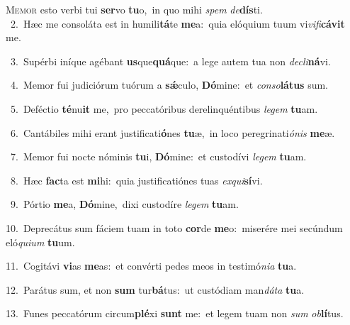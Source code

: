 \lettrine{\initial\textcolor{\initialcolor}{M}}{emor} esto verbi tui \textbf{ser}\-vo \textbf{tu}\-o,~\star in quo mihi \textit{spem} \textit{de}\-\textbf{dís}ti.\\
{\numbfont\textcolor{\numbcolor}{~2.}}~Hæc me consoláta est in humili\-\textbf{tá}\-te \textbf{me}\-a:~\star quia elóquium tuum vi\-\textit{vi}\-\textit{fi}\textbf{cá}\textbf{vit} me.\par
{\numbfont\textcolor{\numbcolor}{~3.}}~Supérbi iníque agébant \textbf{us}\-que\-\textbf{quá}\-que:~\star a lege autem tua non \textit{de}\-\textit{cli}\textbf{ná}vi.\par
{\numbfont\textcolor{\numbcolor}{~4.}}~Memor fui judiciórum tuórum a \textbf{sǽ}\-culo, \textbf{Dó}\-mine:~\star et \textit{con}\-\textit{so}\textbf{lá}\textbf{tus} sum.\par
{\numbfont\textcolor{\numbcolor}{~5.}}~Deféctio \textbf{té}\-nu\textbf{it} me,~\star pro peccatóribus derelinquéntibus \textit{le}\-\textit{gem} \textbf{tu}\-am.\par
{\numbfont\textcolor{\numbcolor}{~6.}}~Cantábiles mihi erant justificati\-\textbf{ó}\-nes \textbf{tu}\-æ,~\star in loco peregrinati\-\textit{ó}\-\textit{nis} \textbf{me}\-æ.\par
{\numbfont\textcolor{\numbcolor}{~7.}}~Memor fui nocte nóminis \textbf{tu}\-i, \textbf{Dó}\-mine:~\star et custodívi \textit{le}\-\textit{gem} \textbf{tu}\-am.\par
{\numbfont\textcolor{\numbcolor}{~8.}}~Hæc \textbf{fac}\-ta est \textbf{mi}\-hi:~\star quia justificatiónes tuas \textit{ex}\-\textit{qui}\textbf{sí}vi.\par
{\numbfont\textcolor{\numbcolor}{~9.}}~Pórtio \textbf{me}\-a, \textbf{Dó}\-mine,~\star dixi custodíre \textit{le}\-\textit{gem} \textbf{tu}\-am.\par
{\numbfont\textcolor{\numbcolor}{10.}}~Deprecátus sum fáciem tuam in toto \textbf{cor}\-de \textbf{me}\-o:~\star miserére mei secúndum eló\-\textit{qui}\-\textit{um} \textbf{tu}\-um.\par
{\numbfont\textcolor{\numbcolor}{11.}}~Cogitávi \textbf{vi}\-as \textbf{me}\-as:~\star et convérti pedes meos in testimó\-\textit{ni}\-\textit{a} \textbf{tu}\-a.\par
{\numbfont\textcolor{\numbcolor}{12.}}~Parátus sum, et non \textbf{sum} tur\-\textbf{bá}\-tus:~\star ut custódiam man\-\textit{dá}\-\textit{ta} \textbf{tu}\-a.\par
{\numbfont\textcolor{\numbcolor}{13.}}~Funes peccatórum circum\-\textbf{plé}\-xi \textbf{sunt} me:~\star et legem tuam non \textit{sum} \textit{ob}\-\textbf{lí}tus.\par
